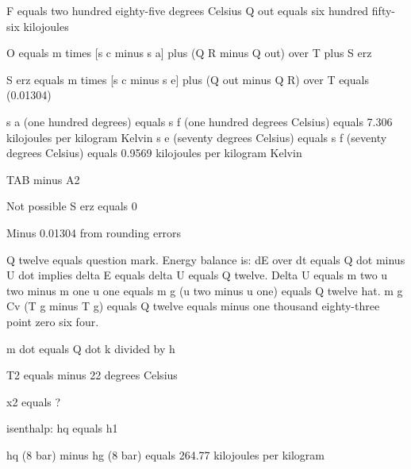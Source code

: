 F equals two hundred eighty-five degrees Celsius  
Q out equals six hundred fifty-six kilojoules  

O equals m times [s c minus s a] plus (Q R minus Q out) over T plus S erz  

S erz equals m times [s c minus s e] plus (Q out minus Q R) over T equals (0.01304)  

s a (one hundred degrees) equals s f (one hundred degrees Celsius) equals 7.306 kilojoules per kilogram Kelvin  
s e (seventy degrees Celsius) equals s f (seventy degrees Celsius) equals 0.9569 kilojoules per kilogram Kelvin  

TAB minus A2  

Not possible  
S erz equals 0  

Minus 0.01304 from rounding errors

Q twelve equals question mark.  
Energy balance is:  
dE over dt equals Q dot minus U dot implies delta E equals delta U equals Q twelve.  
Delta U equals m two u two minus m one u one equals m g (u two minus u one) equals Q twelve hat.  
m g Cv (T g minus T g) equals Q twelve equals minus one thousand eighty-three point zero six four.

m dot equals Q dot k divided by h

T2 equals minus 22 degrees Celsius

x2 equals ?

isenthalp: hq equals h1

hq (8 bar) minus hg (8 bar) equals 264.77 kilojoules per kilogram